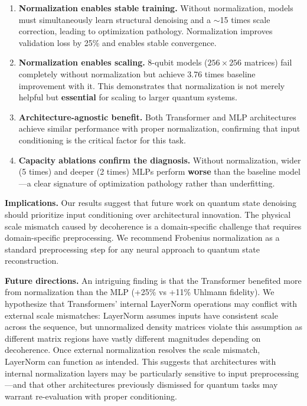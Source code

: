 \documentclass[11pt]{article}
\begin{document}
\begin{enumerate}
\item \textbf{Normalization enables stable training.} Without normalization, models must simultaneously learn structural denoising and a \(\sim\)15 times scale correction, leading to optimization pathology. Normalization improves validation loss by 25\% and enables stable convergence.

\item \textbf{Normalization enables scaling.} 8-qubit models (\(256\times 256\) matrices) fail completely without normalization but achieve 3.76 times baseline improvement with it. This demonstrates that normalization is not merely helpful but \textbf{essential} for scaling to larger quantum systems.

\item \textbf{Architecture-agnostic benefit.} Both Transformer and MLP architectures achieve similar performance with proper normalization, confirming that input conditioning is the critical factor for this task.

\item \textbf{Capacity ablations confirm the diagnosis.} Without normalization, wider (5 times) and deeper (2 times) MLPs perform \textbf{worse} than the baseline model---a clear signature of optimization pathology rather than underfitting.
\end{enumerate}

\textbf{Implications.} Our results suggest that future work on quantum state denoising should prioritize input conditioning over architectural innovation. The physical scale mismatch caused by decoherence is a domain-specific challenge that requires domain-specific preprocessing. We recommend Frobenius normalization as a standard preprocessing step for any neural approach to quantum state reconstruction.

\textbf{Future directions.} An intriguing finding is that the Transformer benefited more from normalization than the MLP (+25\% vs +11\% Uhlmann fidelity). We hypothesize that Transformers' internal LayerNorm operations may conflict with external scale mismatches: LayerNorm assumes inputs have consistent scale across the sequence, but unnormalized density matrices violate this assumption as different matrix regions have vastly different magnitudes depending on decoherence. Once external normalization resolves the scale mismatch, LayerNorm can function as intended. This suggests that architectures with internal normalization layers may be particularly sensitive to input preprocessing---and that other architectures previously dismissed for quantum tasks may warrant re-evaluation with proper conditioning.
\end{document}
